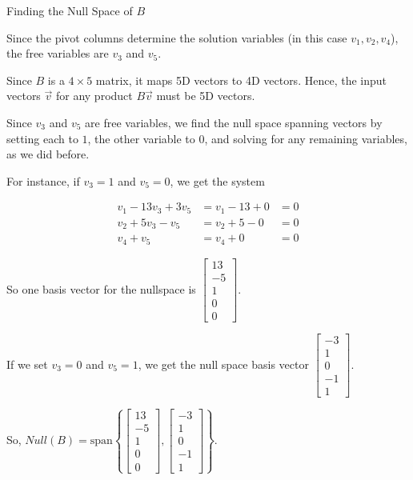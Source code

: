 \documentclass{ximera}
\begin{document}
\begin{problem}{Finding the Null Space of $B$}
\begin{solution}
    Since the pivot columns determine the solution variables (in this case $v_1, v_2, v_4$), the free variables are $v_3$ and $v_5$. 

    Since $B$ is a $4\times 5$ matrix, it maps 5D vectors to 4D vectors. Hence, the input vectors $\vec{v}$ for any product $B\vec{v}$ must be 5D vectors.

    Since $v_3$ and $v_5$ are free variables, we find the null space spanning vectors by setting each to $1$, the other variable to $0$, and solving for any remaining variables, as we did before.

    For instance, if $v_3=1$ and $v_5=0$, we get the system

    \[
    \begin{aligned}
        v_1 - 13v_3 + 3v_5 &= v_1 - 13 + 0 &= 0 \\
        v_2 + 5v_3 - v_5 &= v_2 + 5 - 0 &= 0 \\
        v_4 + v_5 &= v_4 + 0 &= 0
    \end{aligned}
    \]

    So one basis vector for the nullspace is $\begin{bmatrix} 13 \\ -5 \\ 1 \\ 0 \\ 0 \end{bmatrix}$.

    If we set $v_3=0$ and $v_5=1$, we get the null space basis vector $\begin{bmatrix} -3 \\ 1 \\ 0 \\ -1 \\ 1 \end{bmatrix}$.

    So, $Null(B)=\text{span}\left\{ \begin{bmatrix} 13 \\ -5 \\ 1 \\ 0 \\ 0 \end{bmatrix}, \begin{bmatrix} -3 \\ 1 \\ 0 \\ -1 \\ 1 \end{bmatrix} \right\}$.

    \end{solution}

\end{problem}
\end{document}

